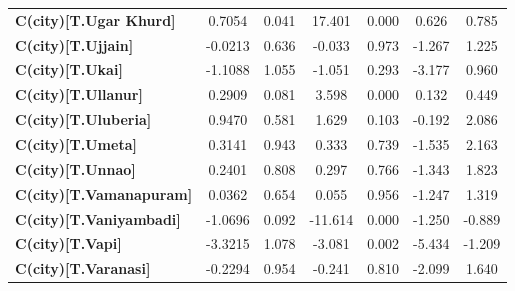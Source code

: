 \begin{center}
\begin{tabular}{lcccccc}
\textbf{C(city)[T.Ugar Khurd]}                                                                      &       0.7054  &        0.041     &    17.401  &         0.000        &        0.626    &        0.785     \\
\textbf{C(city)[T.Ujjain]}                                                                          &      -0.0213  &        0.636     &    -0.033  &         0.973        &       -1.267    &        1.225     \\
\textbf{C(city)[T.Ukai]}                                                                            &      -1.1088  &        1.055     &    -1.051  &         0.293        &       -3.177    &        0.960     \\
\textbf{C(city)[T.Ullanur]}                                                                         &       0.2909  &        0.081     &     3.598  &         0.000        &        0.132    &        0.449     \\
\textbf{C(city)[T.Uluberia]}                                                                        &       0.9470  &        0.581     &     1.629  &         0.103        &       -0.192    &        2.086     \\
\textbf{C(city)[T.Umeta]}                                                                           &       0.3141  &        0.943     &     0.333  &         0.739        &       -1.535    &        2.163     \\
\textbf{C(city)[T.Unnao]}                                                                           &       0.2401  &        0.808     &     0.297  &         0.766        &       -1.343    &        1.823     \\
\textbf{C(city)[T.Vamanapuram]}                                                                     &       0.0362  &        0.654     &     0.055  &         0.956        &       -1.247    &        1.319     \\
\textbf{C(city)[T.Vaniyambadi]}                                                                     &      -1.0696  &        0.092     &   -11.614  &         0.000        &       -1.250    &       -0.889     \\
\textbf{C(city)[T.Vapi]}                                                                            &      -3.3215  &        1.078     &    -3.081  &         0.002        &       -5.434    &       -1.209     \\
\textbf{C(city)[T.Varanasi]}                                                                        &      -0.2294  &        0.954     &    -0.241  &         0.810        &       -2.099    &        1.640     \\

\end{tabular}
\end{center}
